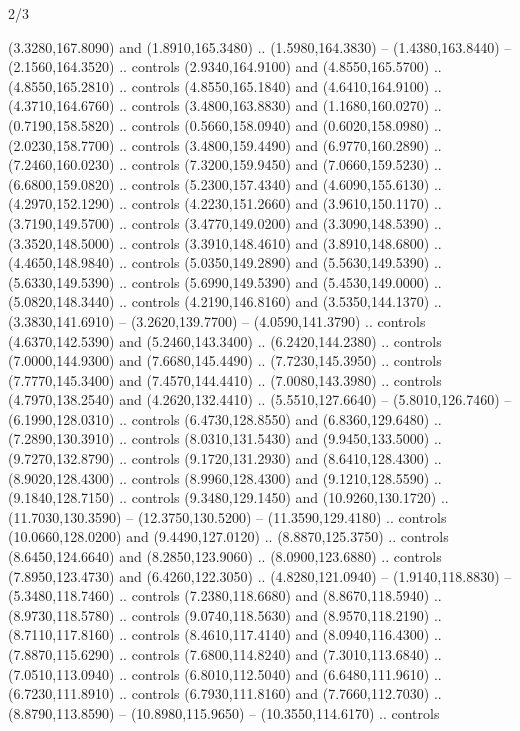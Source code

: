 \begin{flagdescription}{2/3}
\begin{scope}[xshift=0.5\flaglength,yshift=0.5\flagwidth,scale=\stretchfactor]
\begin{scope}[scale=0.001645\flagwidth,yshift=65mm,xshift=-63mm]
\begin{scope}[y=0.80pt, x=0.80pt, yscale=-1,]
\begin{scope}[cm={{1.33333,0.0,0.0,1.33333,(0.0,1e-05)}}]
  (3.3280,167.8090) and (1.8910,165.3480) .. (1.5980,164.3830) --
  (1.4380,163.8440) -- (2.1560,164.3520) .. controls (2.9340,164.9100) and
  (4.8550,165.5700) .. (4.8550,165.2810) .. controls (4.8550,165.1840) and
  (4.6410,164.9100) .. (4.3710,164.6760) .. controls (3.4800,163.8830) and
  (1.1680,160.0270) .. (0.7190,158.5820) .. controls (0.5660,158.0940) and
  (0.6020,158.0980) .. (2.0230,158.7700) .. controls (3.4800,159.4490) and
  (6.9770,160.2890) .. (7.2460,160.0230) .. controls (7.3200,159.9450) and
  (7.0660,159.5230) .. (6.6800,159.0820) .. controls (5.2300,157.4340) and
  (4.6090,155.6130) .. (4.2970,152.1290) .. controls (4.2230,151.2660) and
  (3.9610,150.1170) .. (3.7190,149.5700) .. controls (3.4770,149.0200) and
  (3.3090,148.5390) .. (3.3520,148.5000) .. controls (3.3910,148.4610) and
  (3.8910,148.6800) .. (4.4650,148.9840) .. controls (5.0350,149.2890) and
  (5.5630,149.5390) .. (5.6330,149.5390) .. controls (5.6990,149.5390) and
  (5.4530,149.0000) .. (5.0820,148.3440) .. controls (4.2190,146.8160) and
  (3.5350,144.1370) .. (3.3830,141.6910) -- (3.2620,139.7700) --
  (4.0590,141.3790) .. controls (4.6370,142.5390) and (5.2460,143.3400) ..
  (6.2420,144.2380) .. controls (7.0000,144.9300) and (7.6680,145.4490) ..
  (7.7230,145.3950) .. controls (7.7770,145.3400) and (7.4570,144.4410) ..
  (7.0080,143.3980) .. controls (4.7970,138.2540) and (4.2620,132.4410) ..
  (5.5510,127.6640) -- (5.8010,126.7460) -- (6.1990,128.0310) .. controls
  (6.4730,128.8550) and (6.8360,129.6480) .. (7.2890,130.3910) .. controls
  (8.0310,131.5430) and (9.9450,133.5000) .. (9.7270,132.8790) .. controls
  (9.1720,131.2930) and (8.6410,128.4300) .. (8.9020,128.4300) .. controls
  (8.9960,128.4300) and (9.1210,128.5590) .. (9.1840,128.7150) .. controls
  (9.3480,129.1450) and (10.9260,130.1720) .. (11.7030,130.3590) --
  (12.3750,130.5200) -- (11.3590,129.4180) .. controls (10.0660,128.0200) and
  (9.4490,127.0120) .. (8.8870,125.3750) .. controls (8.6450,124.6640) and
  (8.2850,123.9060) .. (8.0900,123.6880) .. controls (7.8950,123.4730) and
  (6.4260,122.3050) .. (4.8280,121.0940) -- (1.9140,118.8830) --
  (5.3480,118.7460) .. controls (7.2380,118.6680) and (8.8670,118.5940) ..
  (8.9730,118.5780) .. controls (9.0740,118.5630) and (8.9570,118.2190) ..
  (8.7110,117.8160) .. controls (8.4610,117.4140) and (8.0940,116.4300) ..
  (7.8870,115.6290) .. controls (7.6800,114.8240) and (7.3010,113.6840) ..
  (7.0510,113.0940) .. controls (6.8010,112.5040) and (6.6480,111.9610) ..
  (6.7230,111.8910) .. controls (6.7930,111.8160) and (7.7660,112.7030) ..
  (8.8790,113.8590) -- (10.8980,115.9650) -- (10.3550,114.6170) .. controls

\end{scope}
\end{scope}
\end{scope}
\end{scope}
\end{flagdescription}
